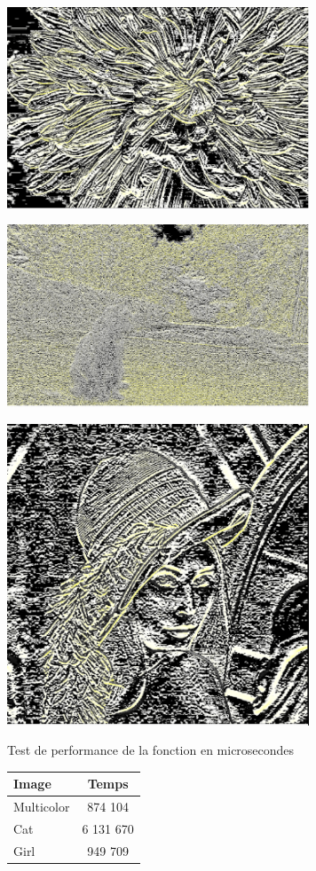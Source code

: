 \documentclass{article}
\begin{document}
\begin{center} 
    \includegraphics[width=9cm]{../Image_fonctions/Multicolor/SobelV.PNG}
\end{center}
\begin{center} 
    \includegraphics[width=9cm]{../Image_fonctions/Cat/SobelV.PNG}
\end{center}
\begin{center} 
    \includegraphics[width=9cm]{../Image_fonctions/Lenna/SobelV.PNG}
\end{center}

\begin{center}
\medbreak
Test de performance de la fonction en microsecondes
\bigbreak
   \begin{tabular}{ | l | c | }
     \hline
     Image & Temps \\
     \hline
     Multicolor & 874 104 \\
     \hline
     Cat & 6 131 670 \\
     \hline
     Girl & 949 709 \\
     \hline
   \end{tabular}
 \end{center}
\bigbreak
\end{document}
